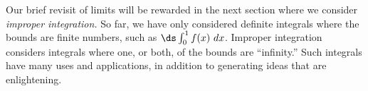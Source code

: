 Our brief revisit of limits will be rewarded in the next section where we consider \textit{improper integration.} So far, we have only considered definite integrals where the bounds are finite numbers, such as $\ds \int_0^1 f(x)\ dx$. Improper integration considers integrals where one, or both, of the bounds are ``infinity.'' Such integrals have many uses and applications, in addition to generating ideas that are enlightening.

